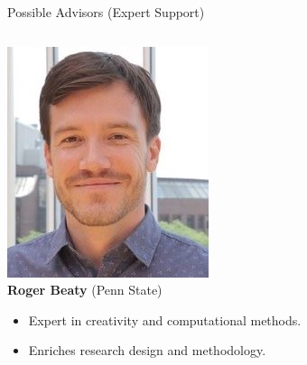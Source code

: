 \documentclass[pdf]{beamer}
\begin{document}
\begin{frame}{Possible Advisors (Expert Support)}
\begin{columns}
\begin{column}{0.5\textwidth}
\centering
\includegraphics[width=0.8\linewidth]{screenshots/Roger Beaty.jpeg}\\
\textbf{Roger Beaty} (Penn State)
\begin{itemize}
    \item Expert in creativity and computational methods.
    \item Enriches research design and methodology.
\end{itemize}
\end{column}

\end{columns}
\end{frame}


\end{document}
